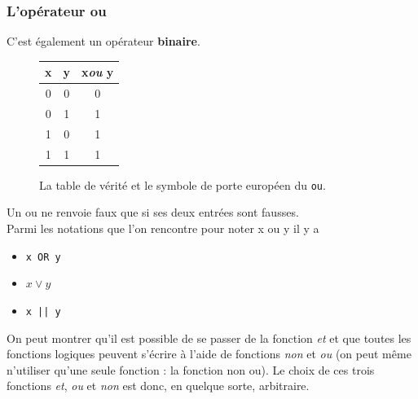 \subsubsection*{L'opérateur \og ou\fg{}}

C'est également un opérateur \textbf{binaire}.

\begin{figure}[H]
    \begin{center}
        \begin{tabular}{|c|c|c|}
            \hline\rowcolor{UGLiOrange}
            {\boxfont\color{white}x} & {\boxfont\color{white}y} & {\boxfont\color{white}x\textit{ou} y} \\

            \hline
            0                        & 0                        & 0                                     \\
            \hline
            0                        & 1                        & 1                                     \\
            \hline
            1                        & 0                        & 1                                     \\
            \hline
            1                        & 1                        & 1                                     \\
            \hline
        \end{tabular}\hspace{3em}
    \end{center}
    \caption*{La table de vérité et le symbole de porte européen du \texttt{ou}.}
\end{figure}

Un \og ou\fg{} ne renvoie faux que si ses deux entrées sont fausses.\\
Parmi les notations que l'on rencontre pour noter \og x ou y\fg{} il y a
\begin{itemize}
    \item 	 \texttt{x OR y}
    \item 	$x\vee y$
    \item 	\texttt{x || y}
\end{itemize}

On peut montrer qu'il est possible de se passer de la fonction \textit{et} et que toutes les fonctions logiques peuvent s'écrire à l'aide de
fonctions \textit{non} et \textit{ou} (on peut même n'utiliser qu'une seule fonction : la fonction \og non ou\fg{}). Le choix de ces trois fonctions
\textit{et}, \textit{ou} et \textit{non} est donc, en quelque sorte, arbitraire.

